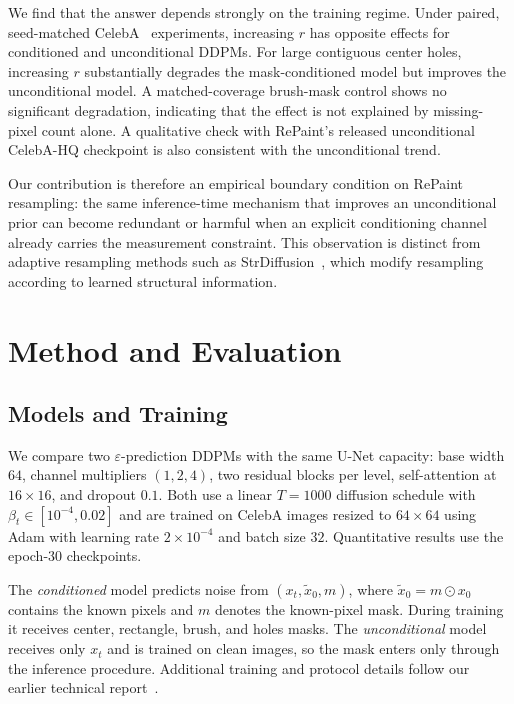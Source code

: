 \documentclass{article}
\begin{document}
We find that the answer depends strongly on the training regime.
Under paired, seed-matched CelebA~\cite{liu2015celeba} experiments, increasing
$r$ has opposite effects for conditioned and unconditional DDPMs.
For large contiguous center holes, increasing $r$ substantially degrades the
mask-conditioned model but improves the unconditional model.
A matched-coverage brush-mask control shows no significant degradation,
indicating that the effect is not explained by missing-pixel count alone.
A qualitative check with RePaint's released unconditional CelebA-HQ checkpoint
is also consistent with the unconditional trend.

Our contribution is therefore an empirical boundary condition on RePaint
resampling: the same inference-time mechanism that improves an unconditional
prior can become redundant or harmful when an explicit conditioning channel
already carries the measurement constraint. This observation is distinct from
adaptive resampling methods such as StrDiffusion~\cite{liu2024strdiffusion},
which modify resampling according to learned structural information.


\section{Method and Evaluation}
\label{sec:method}

\subsection{Models and Training}

We compare two $\varepsilon$-prediction DDPMs with the same U-Net capacity:
base width $64$, channel multipliers $(1,2,4)$, two residual blocks per level,
self-attention at $16{\times}16$, and dropout $0.1$.
Both use a linear $T{=}1000$ diffusion schedule with
$\beta_t\in[10^{-4},0.02]$ and are trained on CelebA images resized to
$64{\times}64$ using Adam with learning rate $2{\times}10^{-4}$ and batch size
$32$. Quantitative results use the epoch-$30$ checkpoints.

The \emph{conditioned} model predicts noise from
$(x_t,\tilde{x}_0,m)$, where
$\tilde{x}_0=m\odot x_0$ contains the known pixels and
$m$ denotes the known-pixel mask.
During training it receives center, rectangle, brush, and holes masks.
The \emph{unconditional} model receives only $x_t$ and is trained on clean
images, so the mask enters only through the inference procedure.
Additional training and protocol details follow our earlier technical
report~\cite{hamouda2026protocol}.
\end{document}
